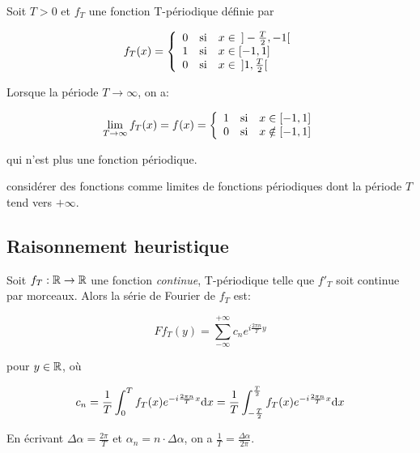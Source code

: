 \begin{idea}
    Soit $T > 0$ et $f_T$ une fonction T-périodique définie par
    
    \[
    f_T (x) =
    \left \{
    \begin{array}{r c l}
        0 & \mathrm{si} & x \in \enspace ]-\frac{T}{2}, -1[ \\
        1 & \mathrm{si} & x \in [-1, 1] \\
        0 & \mathrm{si} & x \in \enspace ]1, \frac{T}{2}[ \\
    \end{array}
    \right .
    \]
    
    Lorsque la période $T \rightarrow \infty$, on a:
    
    \[
    \lim_{T \rightarrow \infty} f_T (x) = f(x) =
    \left \{
    \begin{array}{r c l}
        1 & \mathrm{si} & x \in [-1, 1] \\
        0 & \mathrm{si} & x \notin [-1, 1] \\
    \end{array}
    \right .
    \]
    
    qui n'est plus une fonction périodique.
    
\end{idea}


\begin{idea}
    considérer des fonctions comme limites de fonctions périodiques dont la période $T$ tend vers $+\infty$.
\end{idea}


\subsection{Raisonnement heuristique}

Soit $f_T: \mathbb{R} \rightarrow \mathbb{R}$ une fonction \textit{continue}, T-périodique telle que $f'_T$ soit continue par morceaux.
Alors la série de Fourier de $f_T$ est:

\[
F f_T(y) = \sum_{-\infty}^{+\infty} c_n e^{i \frac{2 \pi n}{T} y}
\]

pour $y \in \mathbb{R}$, où

\[
c_n = \frac{1}{T} \int_{0}^{T} f_T(x) e^{-i \frac{2 \pi n}{T} x} \mathrm{d}x
= \frac{1}{T} \int_{-\frac{T}{2}}^{\frac{T}{2}} f_T(x) e^{-i \frac{2 \pi n}{T} x} \mathrm{d}x
\]

En écrivant
$\Delta \alpha = \frac{2 \pi}{T}$
et
$\alpha_n = n \cdot \Delta \alpha$,
on a
$\frac{1}{T} = \frac{\Delta \alpha}{2 \pi}$.

